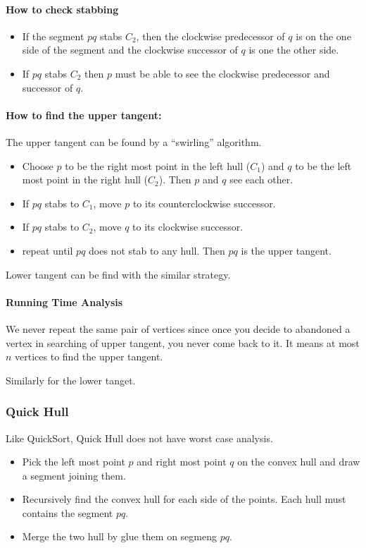\paragraph{How to check stabbing}
\begin{itemize}
\item If the segment $pq$ stabs $C_2$, then the clockwise predecessor of $q$ 
is on the one side of the segment and the clockwise successor of $q$ is one the 
other side.
\item If $pq$ stabs $C_2$ then $p$ must be able to see the clockwise 
predecessor and successor of $q$.
\end{itemize}

\paragraph{How to find the upper tangent:}
The upper tangent can be found by a ``swirling'' algorithm.
\begin{itemize}
\item Choose $p$ to be the right most point in the left hull ($C_1$) and 
$q$ to be the left most point in the right hull ($C_2$). Then $p$ and $q$ see 
each other. 
\item If $pq$ stabs to $C_1$, move $p$ to its counterclockwise successor.
\item If $pq$ stabs to $C_2$, move $q$ to its clockwise successor.
\item repeat until $pq$ does not stab to any hull. Then $pq$ is the upper 
tangent.
\end{itemize}

Lower tangent can be find with the similar strategy.

\paragraph{Running Time Analysis}
We never repeat the same pair of vertices since once you decide to abandoned a 
vertex in searching of upper tangent, you never come back to it. It means at 
most $n$ vertices to find the upper tangent.

Similarly for the lower tanget.

\subsubsection{Quick Hull}
Like QuickSort, Quick Hull does not have worst case analysis.
\begin{itemize}
\item Pick the left most point $p$ and right most point $q$ on the convex hull 
and draw a segment joining them.
\item Recursively find the convex hull for each side of the points. Each hull 
must contains the segment $pq$.
\item Merge the two hull by glue them on segmeng $pq$.
\end{itemize}

